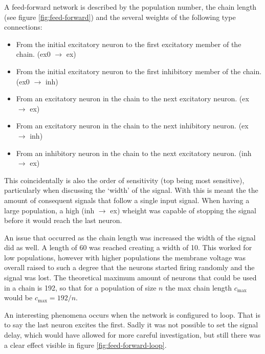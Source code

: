 \documentclass[a4paper,twocolumn]{article}
\begin{document}
A feed-forward network is described by the population number, the chain length
(see figure \ref{fig:feed-forward}) and the several weights of the following
type connections:
\begin{itemize}
    \item From the initial excitatory neuron to the first excitatory member of the
        chain. (ex0 $\rightarrow$ ex)
    \item From the initial excitatory neuron to the first inhibitory member of the
        chain. (ex0 $\rightarrow$ inh)
    \item From an excitatory neuron in the chain to the next excitatory neuron.
        (ex $\rightarrow$ ex)
    \item From an excitatory neuron in the chain to the next inhibitory neuron.
        (ex $\rightarrow$ inh)
    \item From an inhibitory neuron in the chain to the next excitatory neuron.
        (inh $\rightarrow$ ex)
\end{itemize}
This coincidentally is also the order of sensitivity (top being most sensitive),
particularly when discussing the `width' of the signal. With this is meant the
the amount of consequent signals that follow a single input signal. When having
a large population, a high (inh $\rightarrow$ ex) wheight was capable of
stopping the signal before it would reach the last neuron.

An issue that occurred as the chain length was increased the width of the signal
did as well. A length of 60 was reached creating a width of 10. This worked for
low populations, however with higher populations the membrane voltage was
overall raised to such a degree that the neurons started firing randomly and the
signal was lost. The theoretical maximum amount of neurons that could be used in
a chain is 192, so that for a population of size $n$ the max chain length
$c_\text{max}$ would be $c_\text{max} = 192 / n$.

An interesting phenomena occurs when the network is configured to loop. That is
to say the last neuron excites the first. Sadly it was not possible to set the
signal delay, which would have allowed for more careful investigation, but still
there was a clear effect visible in figure \ref{fig:feed-forward-loop}.
\end{document}

